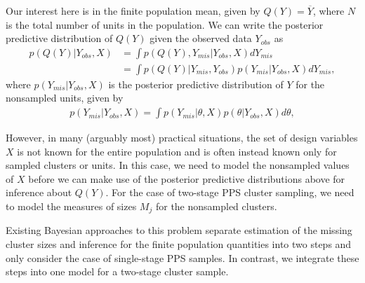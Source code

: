 \documentclass[12pt,a4paper]{article}
\begin{document}
Our interest here is in the finite population mean, given by $Q(Y) = \overline{Y}$, where $N$ is the total number of units in the population. We can write the posterior predictive distribution of $Q(Y)$ given the observed data $Y_{obs}$ as
\begin{align*}
	p(Q(Y)|Y_{obs},X) &= \int p(Q(Y), Y_{mis}|Y_{obs},X) d Y_{mis} \\
	&= \int p(Q(Y)|Y_{mis}, Y_{obs}) p(Y_{mis}|Y_{obs},X) d Y_{mis},
\end{align*}
where $p(Y_{mis}|Y_{obs},X)$ is the posterior predictive distribution of $Y$ for the nonsampled units, given by
\begin{align*}
	p(Y_{mis}|Y_{obs},X) = \int p(Y_{mis}|\theta,X) p(\theta|Y_{obs},X) d\theta,
\end{align*}

However, in many (arguably most) practical situations, the set of design variables $X$ is not known for the entire population and is often instead known only for sampled clusters or units. In this case, we need to model the nonsampled values of $X$ before we can make use of the posterior predictive distributions above for inference about $Q(Y)$. For the case of two-stage PPS cluster sampling, we need to model the measures of sizes $M_j$ for the nonsampled clusters.

Existing Bayesian approaches to this problem \citep{zangeneh2011, zangeneh2015} separate estimation of the missing cluster sizes and inference for the finite population quantities into two steps and only consider the case of single-stage PPS samples. In contrast, we integrate these steps into one model for a two-stage cluster sample.
\end{document}
